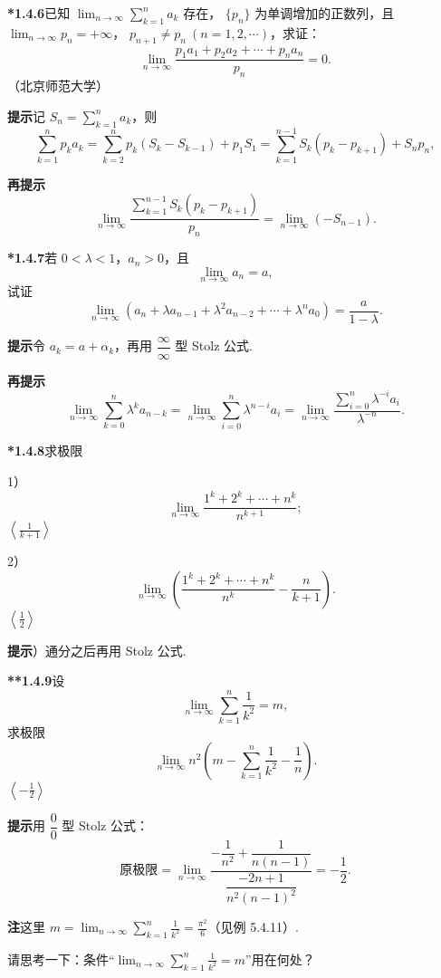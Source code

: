 \documentclass[UTF8, 12pt, fontset=fandol, oneside]{ctexart}
\begin{document}
\noindent\textbf{*1.4.6}\quad 已知 $\displaystyle\lim_{n\to\infty}\sum_{k=1}^n a_k$ 存在，
$\{p_n\}$ 为单调增加的正数列，且 $\displaystyle\lim_{n\to\infty}p_n=+\infty$，
$p_{n+1}\ne p_n\ (n=1,2,\cdots)$，求证：
\[
  \lim_{n\to\infty}\frac{p_1a_1+p_2a_2+\cdots+p_na_n}{p_n}=0.
\]
（北京师范大学）

\noindent\textbf{提示}\quad 记 $S_n=\sum_{k=1}^n a_k$，则
\[
  \sum_{k=1}^np_ka_k
  =\sum_{k=2}^np_k(S_k-S_{k-1})+p_1S_1
  =\sum_{k=1}^{n-1}S_k(p_k-p_{k+1})+S_np_n,
\]

\noindent\textbf{再提示}\quad
\[
  \lim_{n\to\infty}
  \frac{\displaystyle\sum_{k=1}^{n-1}S_k(p_k-p_{k+1})}{p_n}
  =\lim_{n\to\infty}(-S_{n-1}).
\]

\noindent\textbf{*1.4.7}\quad 若 $0<\lambda<1$，$a_n>0$，且
\[
  \lim_{n\to\infty}a_n=a,
\]
试证
\[
  \lim_{n\to\infty}(a_n+\lambda a_{n-1}+\lambda^2a_{n-2}+\cdots+\lambda^na_0)
  =\frac{a}{1-\lambda}.
\]

\noindent\textbf{提示}\quad 令 $a_k=a+\alpha_k$，再用 $\dfrac\infty\infty$ 型 Stolz 公式.

\noindent\textbf{再提示}\quad
\[
  \lim_{n\to\infty}\sum_{k=0}^n\lambda^ka_{n-k}
  =\lim_{n\to\infty}\sum_{i=0}^n\lambda^{n-i}a_i
  =\lim_{n\to\infty}
  \frac{\displaystyle\sum_{i=0}^n\lambda^{-i}a_i}{\lambda^{-n}}.
\]

\noindent\textbf{*1.4.8}\quad 求极限

1）
\[
  \lim_{n\to\infty}\frac{1^k+2^k+\cdots+n^k}{n^{k+1}};
\]
\quad $\left\langle\frac1{k+1}\right\rangle$

2）
\[
  \lim_{n\to\infty}\left(\frac{1^k+2^k+\cdots+n^k}{n^k}-\frac n{k+1}\right).
\]
\quad $\left\langle\frac12\right\rangle$

\noindent\textbf{提示}）通分之后再用 Stolz 公式.

\noindent\textbf{**1.4.9}\quad 设
\[
  \lim_{n\to\infty}\sum_{k=1}^n\frac1{k^2}=m,
\]
求极限
\[
  \lim_{n\to\infty}n^2\left(m-\sum_{k=1}^n\frac1{k^2}-\frac1n\right).
\]
\quad $\left\langle-\frac12\right\rangle$

\noindent\textbf{提示}\quad 用 $\dfrac00$ 型 Stolz 公式：
\[
  \text{原极限}
  =\lim_{n\to\infty}
  \frac{-\dfrac1{n^2}+\dfrac1{n(n-1)}}{\dfrac{-2n+1}{n^2(n-1)^2}}
  =-\frac12.
\]

\noindent\textbf{注}\quad 这里 $\displaystyle m=\lim_{n\to\infty}\sum_{k=1}^n\frac1{k^2}=\frac{\pi^2}{6}$（见例 5.4.11）.

请思考一下：条件“$\displaystyle\lim_{n\to\infty}\sum_{k=1}^n\frac1{k^2}=m$”用在何处？
\end{document}
